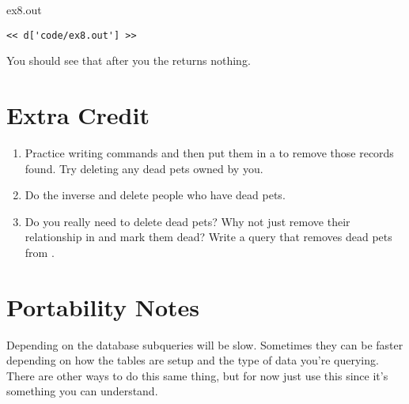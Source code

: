 \begin{code}{ex8.out}
\begin{Verbatim}
<< d['code/ex8.out'] >>
\end{Verbatim}
\end{code}

You should see that after you  the  returns
nothing.

\section{Extra Credit}

\begin{enumerate}
\item Practice writing  commands and then put them in a
     to remove those records found.  Try
    deleting any dead pets owned by you.
\item Do the inverse and delete people who have dead pets.
\item Do you really need to delete dead pets?  Why not just remove their
    relationship in  and mark them dead?  Write a 
    query that removes dead pets from .
\end{enumerate}

\section{Portability Notes}

Depending on the database subqueries will be slow.  Sometimes they can be
faster depending on how the tables are setup and the type of data you're
querying.  There are other ways to do this same thing, but for now just
use this since it's something you can understand.
